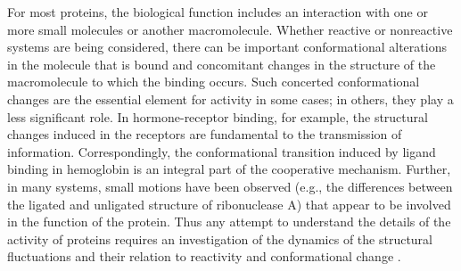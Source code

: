 For most proteins, the biological function includes an interaction with one or more small molecules or another macromolecule. 
Whether reactive or nonreactive systems are being considered, there can be important conformational alterations in the molecule that is bound and concomitant changes in the structure of the macromolecule to which the binding occurs. Such concerted conformational changes are the essential element for activity in some cases; in others, they play a less significant role.
In hormone-receptor binding, for example, the structural changes induced in the receptors are fundamental to the transmission of information. 
Correspondingly, the conformational transition induced by ligand binding in hemoglobin is an integral part of the cooperative mechanism.
Further, in many systems, small motions have been observed (e.g., the differences between the ligated and unligated structure of ribonuclease A) that appear to be involved in the function of the protein. 
Thus any attempt to understand the details of the activity of proteins requires an investigation of the dynamics of the structural fluctuations and their relation to reactivity and conformational change
\cite{brooks1988proteins}.


